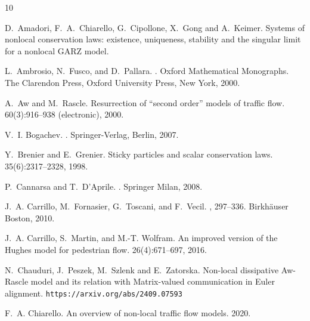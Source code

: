 \documentclass[11pt,a4paper,oneside]{amsart}
\begin{document}
\begin{thebibliography}{10}
\def\ocirc#1{\ifmmode\setbox0=\hbox{$#1$}\dimen0=\ht0 \advance\dimen0
  by1pt\rlap{\hbox to\wd0{\hss\raise\dimen0
  \hbox{\hskip.2em$\scriptscriptstyle\circ$}\hss}}#1\else {\accent"17 #1}\fi}

D.~Amadori, F.~A.~Chiarello, G.~Cipollone, X.~Gong and A.~Keimer.
\newblock Systems of nonlocal conservation laws: existence, uniqueness, stability and the singular limit for a nonlocal GARZ model.

 L.~Ambrosio, N.~Fusco, and D.~Pallara.
.
\newblock Oxford Mathematical Monographs. The Clarendon Press, Oxford
  University Press, New York, 2000.

 A.~Aw and M.~Rascle.
\newblock Resurrection of ``second order'' models of traffic flow.
 60(3):916--938 (electronic), 2000.

 V.~I. Bogachev.
.
\newblock Springer-Verlag, Berlin, 2007.

 Y.~Brenier and E.~Grenier.
\newblock Sticky particles and scalar conservation laws.
 35(6):2317--2328, 1998.

 P.~Cannarsa and T.~D'Aprile.
.
\newblock Springer Milan, 2008.

 J.~A. Carrillo, M.~Fornasier, G.~Toscani, and F.~Vecil.
, 297--336.
\newblock Birkh\"{a}user Boston, 2010.

 J.~A. Carrillo, S.~Martin, and M.-T. Wolfram.
\newblock An improved version of the {H}ughes model for pedestrian flow.
 26(4):671--697, 2016.

{N.~Chauduri, J.~Peszek, M.~Szlenk and E.~Zatorska.}
\newblock %
{Non-local dissipative Aw-Rascle model and its relation with Matrix-valued communication in Euler alignment}.
\newblock
{\tt https://arxiv.org/abs/2409.07593}

 F.~A. Chiarello.
\newblock An overview of non-local traffic flow models.
 2020.


\end{thebibliography}
\end{document}

